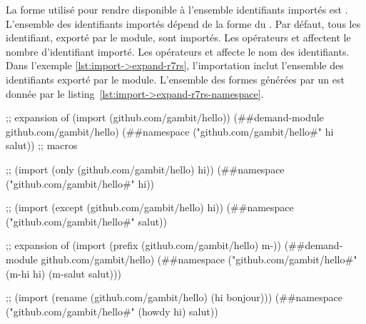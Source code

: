 La forme utilisé pour rendre disponible à l'ensemble identifiants importés est
. L'ensemble des identifiants importés dépend de la forme
du . Par défaut, tous les identifiant, exporté par le module,
sont importés.  Les opérateurs  et  affectent le
nombre d'identifiant importé. Les opérateurs  et
 affecte le nom des identifiants.  Dans l'exemple
\ref{lst:import->expand-r7rs}, l'importation inclut l'ensemble des identifiants
exporté par le module. L'ensemble des formes  générées
par un  est donnée par le listing~\ref{lst:import->expand-r7rs-namespace}.
\\

\begin{center}
  \begin{mplisting}{1}
;; expansion of (import (github.com/gambit/hello))
(##demand-module github.com/gambit/hello)
(##namespace ("github.com/gambit/hello#" hi salut))
;; macros
\end{mplisting}
\end{center}


\begin{center}
  \begin{mplisting}{1}
;; (import (only (github.com/gambit/hello) hi))
(##namespace ("github.com/gambit/hello#" hi))

;; (import (except (github.com/gambit/hello) hi))
(##namespace ("github.com/gambit/hello#" salut))

;; expansion of (import (prefix (github.com/gambit/hello) m-))
(##demand-module github.com/gambit/hello)
(##namespace ("github.com/gambit/hello#" (m-hi hi) (m-salut salut)))

;; (import (rename (github.com/gambit/hello) (hi bonjour)))
(##namespace ("github.com/gambit/hello#" (howdy hi) salut))
\end{mplisting}
\end{center}


